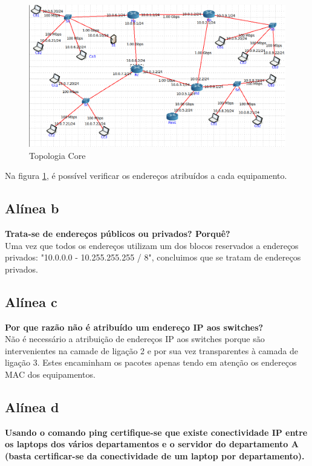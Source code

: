 \documentclass[a4paper]{report}
\begin{document}
\begin{figure}[H]
    \centering 
    \includegraphics[width=\textwidth]{images/topologiaCore.png}
    \caption{Topologia Core}
    \label{fig:topologiaCore}
\end{figure}
Na figura \ref{fig:topologiaCore}, é possível verificar os endereços atribuídos a cada 
equipamento. 

\subsection{Alínea b}
\textbf{Trata-se de endereços públicos ou privados? Porquê?}\\
Uma vez que todos os endereços utilizam um dos blocos reservados a endereços privados:
"10.0.0.0 - 10.255.255.255 / 8", concluimos que se tratam de endereços privados.

\subsection{Alínea c}
\textbf{Por que razão não é atribuído um endereço IP aos switches?}\\
Não é necessário a atribuição de endereços IP aos switches porque são 
intervenientes na camade de ligação 2 e por sua vez transparentes à camada de
ligação 3. Estes encaminham os pacotes apenas tendo em atenção os endereços MAC dos
equipamentos.\\

\subsection{Alínea d}
\textbf{Usando o comando ping certifique-se que existe conectividade IP entre 
os laptops dos vários departamentos e o servidor do departamento A 
(basta certificar-se da conectividade de um laptop por departamento).}\\
\end{document}
